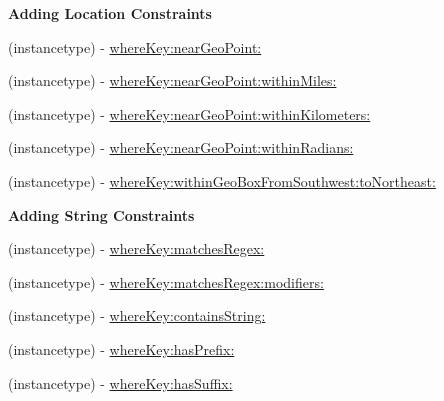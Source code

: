 \begin{Indent}{\bf Adding Location Constraints}\par
{\em 

 

 }\begin{DoxyCompactItemize}
\item 
(instancetype) -\/ \hyperlink{interface_p_f_query_ae4ce22289994f54f9da4592a9cc61e4f}{where\+Key\+:near\+Geo\+Point\+:}
\item 
(instancetype) -\/ \hyperlink{interface_p_f_query_a54265e0516edcaec3e9c8b2a6b64e475}{where\+Key\+:near\+Geo\+Point\+:within\+Miles\+:}
\item 
(instancetype) -\/ \hyperlink{interface_p_f_query_adc0d2ec33e60451b3f25a2a6adf2f841}{where\+Key\+:near\+Geo\+Point\+:within\+Kilometers\+:}
\item 
(instancetype) -\/ \hyperlink{interface_p_f_query_a5f3111028461ed003263b2501587e99c}{where\+Key\+:near\+Geo\+Point\+:within\+Radians\+:}
\item 
(instancetype) -\/ \hyperlink{interface_p_f_query_a9c93a442a25e1eef0ab3e0a2f6a2c2c4}{where\+Key\+:within\+Geo\+Box\+From\+Southwest\+:to\+Northeast\+:}
\end{DoxyCompactItemize}
\end{Indent}
\begin{Indent}{\bf Adding String Constraints}\par
{\em 

 

 }\begin{DoxyCompactItemize}
\item 
(instancetype) -\/ \hyperlink{interface_p_f_query_ae97237da88dc4983ed4d9742670a766c}{where\+Key\+:matches\+Regex\+:}
\item 
(instancetype) -\/ \hyperlink{interface_p_f_query_a1c722c2a6e868de764b2e8fa064c17a1}{where\+Key\+:matches\+Regex\+:modifiers\+:}
\item 
(instancetype) -\/ \hyperlink{interface_p_f_query_a3b2f86743c0698982730fe5c6eda118b}{where\+Key\+:contains\+String\+:}
\item 
(instancetype) -\/ \hyperlink{interface_p_f_query_a3754b99c698d53f6eff0cdf8b11ee051}{where\+Key\+:has\+Prefix\+:}
\item 
(instancetype) -\/ \hyperlink{interface_p_f_query_a32c8db65d8cae41509475bb6d95ca579}{where\+Key\+:has\+Suffix\+:}
\end{DoxyCompactItemize}
\end{Indent}

